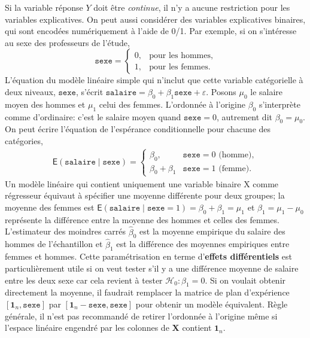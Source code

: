 \documentclass[
  11pt,
  letterpaper,
]{article}
\theoremstyle{definition}
\theoremstyle{definition}
\theoremstyle{definition}
\theoremstyle{definition}
\theoremstyle{remark}
\begin{document}
Si la variable réponse \(Y\) doit être \emph{continue}, il n'y a aucune restriction pour les variables explicatives. On peut aussi considérer des variables explicatives binaires, qui sont encodées numériquement à l'aide de 0/1. Par exemple, si on s'intéresse au sexe des professeurs de l'étude,
\[\texttt{sexe} = \begin{cases} 0 , & \text{pour les hommes},\\
1, & \text{pour les femmes.}
\end{cases}
\]
L'équation du modèle linéaire simple qui n'inclut que cette variable catégorielle à deux niveaux, \(\texttt{sexe}\), s'écrit \(\texttt{salaire} = \beta_0 + \beta_1 \texttt{sexe} + \varepsilon\). Posons \(\mu_0\) le salaire moyen des hommes et \(\mu_1\) celui des femmes. L'ordonnée à l'origine \(\beta_0\) s'interprète comme d'ordinaire: c'est le salaire moyen quand \(\texttt{sexe}=0\), autrement dit \(\beta_0=\mu_0\). On peut écrire l'équation de l'espérance conditionnelle pour chacune des catégories,
\begin{align*}
\mathsf{E}(\texttt{salaire} \mid \texttt{sexe})= \begin{cases}
\beta_0, & \texttt{sexe}=0 \text{ (homme)}, \\
\beta_0 + \beta_1 & \texttt{sexe}=1 \text{ (femme)}.
\end{cases}
\end{align*}
Un modèle linéaire qui contient uniquement une variable binaire \(\mathrm{X}\) comme régresseur équivaut à spécifier une moyenne différente pour deux groupes; la moyenne des femmes est \(\mathsf{E}(\texttt{salaire} \mid \texttt{sexe}=1) = \beta_0 + \beta_1 = \mu_1\) et \(\beta_1=\mu_1-\mu_0\) représente la différence entre la moyenne des hommes et celles des femmes. L'estimateur des moindres carrés \(\widehat{\beta}_0\) est la moyenne empirique du salaire des hommes de l'échantillon et \(\widehat{\beta}_1\) est la différence des moyennes empiriques entre femmes et hommes. Cette paramétrisation en terme d'\textbf{effets différentiels} est particulièrement utile si on veut tester s'il y a une différence moyenne de salaire entre les deux sexe car cela revient à tester \(\mathscr{H}_0: \beta_1=0\). Si on voulait obtenir directement la moyenne, il faudrait remplacer la matrice de plan d'expérience \([\mathbf{1}_n, \texttt{sexe}]\) par \([\mathbf{1}_n - \texttt{sexe}, \texttt{sexe}]\) pour obtenir un modèle équivalent. Règle générale, il n'est pas recommandé de retirer l'ordonnée à l'origine même si l'espace linéaire engendré par les colonnes de \(\mathbf{X}\) contient \(\mathbf{1}_n\).
\end{document}
